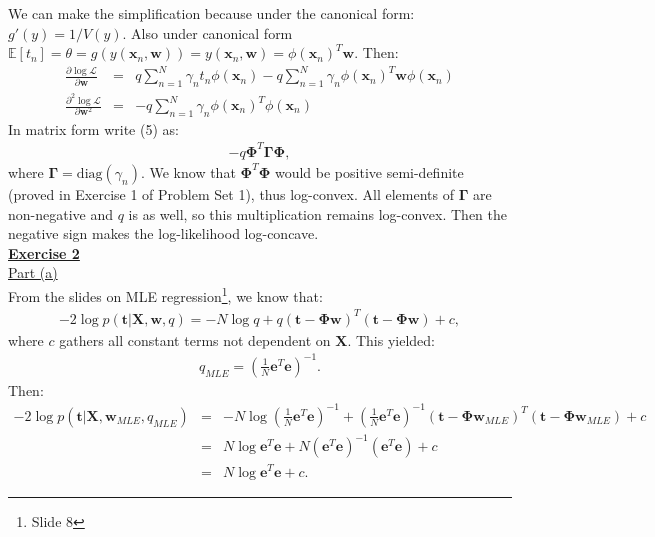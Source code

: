 \documentclass[a4paper, 11pt]{article}
\begin{document}
We can make the simplification because under the canonical form: $g'(y) = 1/V(y)$. Also under canonical form $\mathbb{E}[t_n] = \theta = g(y(\mathbf{x}_n, \mathbf{w})) = y(\mathbf{x}_n, \mathbf{w}) = \phi(\mathbf{x}_n)^T \mathbf{w}$. Then:
\begin{eqnarray}
\frac{\partial \log \mathcal{L}}{\partial \mathbf{w}} &=& q \sum_{n=1}^{N} \gamma_n t_n \phi(\mathbf{x}_n) - q \sum_{n=1}^{N} \gamma_n \phi(\mathbf{x}_n)^T \mathbf{w} \phi(\mathbf{x}_n)  \nonumber \\
\frac{\partial^2 \log \mathcal{L}}{\partial \mathbf{w}^2} &=& -q \sum_{n=1}^{N} \gamma_n \phi(\mathbf{x}_n)^T \phi(\mathbf{x}_n)
\end{eqnarray}
In matrix form write (5) as:
\begin{eqnarray}
-q \mathbf{\Phi}^T \mathbf{\Gamma} \mathbf{\Phi}, \nonumber
\end{eqnarray}
where $\mathbf{\Gamma} = \text{diag}(\gamma_n)$. We know that $\mathbf{\Phi}^T \mathbf{\Phi}$ would be positive semi-definite (proved in Exercise 1 of Problem Set 1), thus log-convex. All elements of $\mathbf{\Gamma}$ are non-negative and $q$ is as well, so this multiplication remains log-convex. Then the negative sign makes the log-likelihood log-concave.\\
\newpage
\textbf{\underline{Exercise 2}}\\
\newline \underline{Part (a)}\\
\newline From the slides on MLE regression\footnote{Slide 8}, we know that:
\begin{eqnarray}
-2 \log p(\mathbf{t} | \mathbf{X}, \mathbf{w}, q) = -N \log q + q (\mathbf{t} - \mathbf{\Phi w})^T (\mathbf{t} - \mathbf{\Phi w}) + c, \nonumber
\end{eqnarray}
where $c$ gathers all constant terms not dependent on $\mathbf{X}$. This yielded:
\begin{eqnarray}
q_{MLE} = \left( \frac{1}{N} \mathbf{e}^T \mathbf{e} \right)^{-1}. \nonumber
\end{eqnarray}
Then:
\begin{eqnarray}
-2 \log p(\mathbf{t} | \mathbf{X}, \mathbf{w}_{MLE}, q_{MLE}) &=& -N \log \left( \frac{1}{N} \mathbf{e}^T \mathbf{e} \right)^{-1} + \left( \frac{1}{N} \mathbf{e}^T \mathbf{e} \right)^{-1} (\mathbf{t} - \mathbf{\Phi} \mathbf{w}_{MLE})^T (\mathbf{t} - \mathbf{\Phi} \mathbf{w}_{MLE}) + c \nonumber \\
&=& N \log \mathbf{e}^T \mathbf{e} + N \left( \mathbf{e}^T \mathbf{e} \right)^{-1} \left( \mathbf{e}^T \mathbf{e} \right) + c \nonumber \\
&=& N \log \mathbf{e}^T \mathbf{e} + c. \nonumber
\end{eqnarray}
\end{document}
